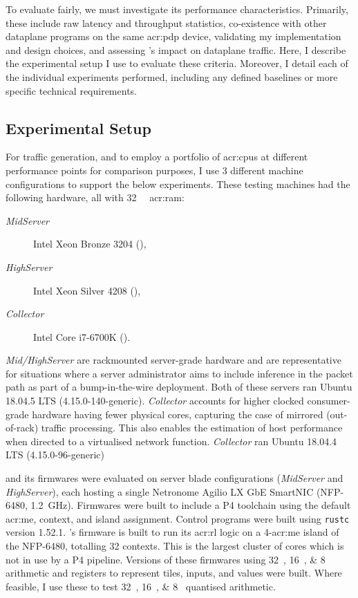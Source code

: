 To evaluate \approachshort{} fairly, we must investigate its performance characteristics.
Primarily, these include raw latency and throughput statistics, co-existence with other dataplane programs on the same \gls{acr:pdp} device, validating my implementation and design choices, and assessing \approachshort{}'s impact on dataplane traffic.
Here, I describe the experimental setup I use to evaluate these criteria.
Moreover, I detail each of the individual experiments performed, including any defined baselines or more specific technical requirements.

\subsection{Experimental Setup}\label{sec:experimental-setup}
For traffic generation, and to employ a portfolio of \glspl{acr:cpu} at different performance points for comparison purposes, I use 3 different machine configurations to support the below experiments.
These testing machines had the following hardware, all with \qty{32}{\gibi\byte} \gls{acr:ram}:
\begin{description}
	\item[\emph{MidServer}] Intel Xeon Bronze 3204 (),
	\item[\emph{HighServer}] Intel Xeon Silver 4208 (),
	\item[\emph{Collector}] Intel Core i7-6700K ().
\end{description}
\emph{Mid/HighServer} are rackmounted server-grade hardware and are representative for situations where a server administrator aims to include inference in the packet path as part of a bump-in-the-wire deployment.
Both of these servers ran Ubuntu 18.04.5 LTS (4.15.0-140-generic).
\emph{Collector} accounts for higher clocked consumer-grade hardware having fewer physical cores, capturing the case of mirrored (out-of-rack) traffic processing.
This also enables the estimation of host performance when directed to a virtualised network function.
\emph{Collector} ran Ubuntu 18.04.4 LTS (4.15.0-96-generic)

\approachshort{} and its firmwares were evaluated on server blade configurations (\emph{MidServer} and \emph{HighServer}), each hosting a single Netronome Agilio LX GbE SmartNIC (NFP-6480, \qty{1.2}{\giga\hertz}).
Firmwares were built to include a P4 toolchain using the default \gls{acr:me}, context, and island assignment.
Control programs were built using \texttt{rustc} version 1.52.1.
\approachshort{}'s firmware is built to run its \gls{acr:rl} logic on a \num{4}-\gls{acr:me} island of the NFP-6480, totalling \num{32} contexts.
This is the largest cluster of cores which is not in use by a P4 pipeline.
Versions of these firmwares using \qtylist{32;16;8}{\bit} arithmetic and registers to represent tiles, inputs, and values were built.
Where feasible, I use these to test \qtylist{32;16;8}{\bit} quantised arithmetic.

